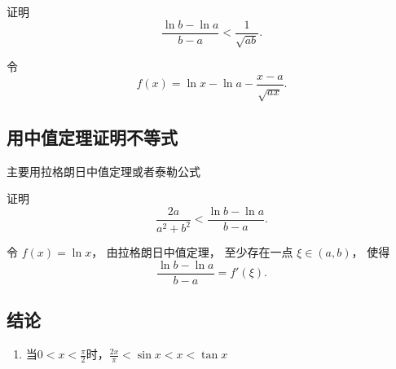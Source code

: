 \documentclass[a4paper,12pt]{article}
\begin{document}
    \begin{analysisbox}[Example]
        证明
        \[
            \frac{\ln b - \ln a}{\,b - a\,}
            <
            \frac{1}{\sqrt{ab}}.
        \]

        令
        \[
            f(x)
            = \ln x - \ln a - \frac{x-a}{\sqrt{ax}}.
        \]
    \end{analysisbox}

    \subsection{用中值定理证明不等式}

    主要用拉格朗日中值定理或者泰勒公式

    \begin{analysisbox}[Example]
        证明
        \[
            \frac{2a}{a^2+b^2}
            <
            \frac{\ln b-\ln a}{\,b-a\,}.
        \]

        令 $f(x)=\ln x$，
        由拉格朗日中值定理，
        至少存在一点 $\xi\in(a,b)$，
        使得
        \[
            \frac{\ln b-\ln a}{b-a}
            = f'(\xi).
        \]
    \end{analysisbox}

    \subsection{结论}

    \begin{enumerate}
        \item 当$0 < x < \displaystyle\frac{\pi}{2}$时，$\displaystyle\frac{2x}{\pi} < \sin x < x < \tan x$
    \end{enumerate}
\end{document}
